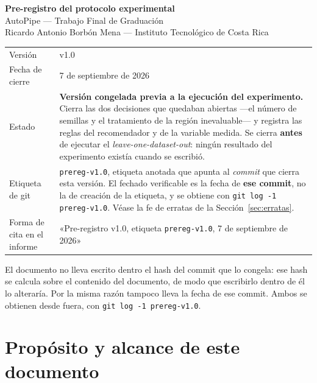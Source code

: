 \documentclass[11pt,letterpaper]{article}
\newcommand{\preregversion}{v1.0}
\newcommand{\preregfecha}{7 de septiembre de 2026}
\newcommand{\preregtag}{prereg-v1.0}
\begin{document}
\begin{center}
{\LARGE\bfseries\color{tecnavy} Pre-registro del protocolo experimental}\\[6pt]
{\large AutoPipe --- Trabajo Final de Graduación}\\[4pt]
{\small Ricardo Antonio Borbón Mena --- Instituto Tecnológico de Costa Rica}\\[14pt]

\begin{tabularx}{0.92\textwidth}{L{3.6cm} Y}
\toprule
{}  \\
\midrule
Versión & \preregversion \\
Fecha de cierre & \preregfecha \\
Estado & \textbf{Versión congelada previa a la ejecución del experimento.} Cierra
las dos decisiones que quedaban abiertas —el número de semillas y el tratamiento
de la región inevaluable— y registra las reglas del recomendador y de la variable
medida. Se cierra \textbf{antes} de ejecutar el
\textit{leave-one-dataset-out}: ningún resultado del experimento existía cuando
se escribió. \\
Etiqueta de git & \texttt{\preregtag}, etiqueta anotada que apunta al
\emph{commit} que cierra esta versión. El fechado verificable es la fecha de
\textbf{ese commit}, no la de creación de la etiqueta, y se obtiene con
\texttt{git log -1 \preregtag}. Véase la fe de erratas de la
Sección~\ref{sec:erratas}. \\
Forma de cita en el informe & «Pre-registro \preregversion, etiqueta
\texttt{\preregtag}, \preregfecha» \\
\bottomrule
\end{tabularx}

\vspace{6pt}
{\small\color{gris} El documento no lleva escrito dentro el hash del commit que lo
congela: ese hash se calcula sobre el contenido del documento, de modo que
escribirlo dentro de él lo alteraría. Por la misma razón tampoco lleva la fecha de
ese commit. Ambos se obtienen desde fuera, con \texttt{git log -1 \preregtag}.\par}
\end{center}

\vspace{10pt}

\section{Propósito y alcance de este documento}
\end{document}
